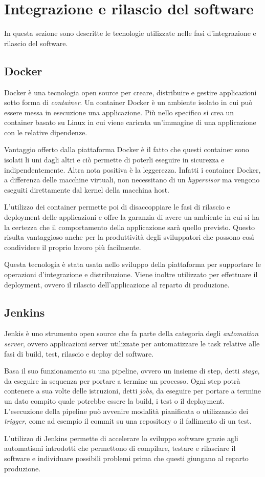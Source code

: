 \section{Integrazione e rilascio del software}
In questa sezione sono descritte le tecnologie utilizzate nelle fasi d'integrazione e rilascio del software.

\subsection{Docker}
Docker \cite{Docker} è una tecnologia open source per creare, distribuire e gestire applicazioni sotto forma di \textit{container}.
Un container Docker è un ambiente isolato in cui può essere messa in esecuzione una applicazione.
Più nello specifico si crea un container basato su Linux in cui viene caricata un'immagine di una applicazione con le relative dipendenze.

Vantaggio offerto dalla piattaforma Docker è il fatto che questi container sono isolati li uni dagli altri
e ciò permette di poterli eseguire in sicurezza e indipendentemente.
Altra nota positiva è la leggerezza. Infatti i container Docker, a differenza delle macchine virtuali, non necessitano
di un \textit{hypervisor} ma vengono eseguiti direttamente dal kernel della macchina host.

L'utilizzo dei container permette poi di disaccoppiare le fasi di rilascio e deployment delle applicazioni e offre la garanzia
di avere un ambiente in cui si ha la certezza che il comportamento della applicazione sarà quello previsto. Questo risulta
vantaggioso anche per la produttività degli sviluppatori che possono così condividere
il proprio lavoro più facilmente.

Questa tecnologia è stata usata nello sviluppo della piattaforma per supportare le operazioni d'integrazione e distribuzione.
Viene inoltre utilizzato per effettuare il deployment, ovvero il rilascio dell'applicazione al reparto di produzione.

\subsection{Jenkins}
Jenkis \cite{Jenkins} è uno strumento open source che fa parte della categoria degli \textit{automation server}, ovvero applicazioni server utilizzate
per automatizzare le task relative alle fasi di build, test, rilascio e deploy del software.

Basa il suo funzionamento su una pipeline, ovvero un insieme di step, detti \textit{stage}, da eseguire in sequenza per portare a termine un processo.
Ogni step potrà contenere a sua volte delle istruzioni, detti \textit{jobs}, da eseguire per portare a termine un dato compito quale potrebbe essere la build, i test o il deployment.
L'esecuzione della pipeline può avvenire modalità pianificata o utilizzando dei \textit{trigger}, come ad esempio il commit su una repository o il fallimento di un test.

L'utilizzo di Jenkins permette di accelerare lo sviluppo software grazie agli automatismi introdotti che permettono di compilare, testare e rilasciare il software e individuare
possibili problemi prima che questi giungano al reparto produzione.